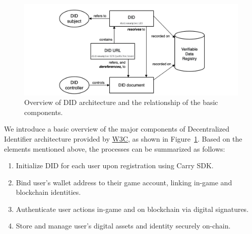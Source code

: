 \begin{figure}[!htb]
    \centering
    \includegraphics[width=\textwidth]{did.png}
    \caption{Overview of DID architecture and the relationship of the basic components.}
    \label{fig:did}
\end{figure}
We introduce a basic overview of the major components of Decentralized Identifier architecture provided by \href{https://www.w3.org/TR/did-core/}{W3C}, as shown in Figure~\ref{fig:did}. Based on the elements mentioned above, the processes can be summarized as follows: 

\begin{enumerate}
    \item Initialize DID for each user upon registration using Carry SDK.
    \item Bind user's wallet address to their game account, linking in-game and blockchain identities.
    \item Authenticate user actions in-game and on blockchain via digital signatures.
    \item Store and manage user's digital assets and identity securely on-chain.
\end{enumerate}


